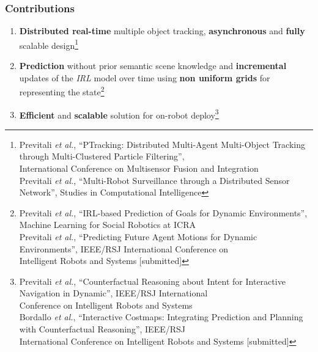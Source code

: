 \begin{frame}
	\frametitle{Contributions}
	
	\Large
	
	\begin{enumerate}
		\item \textbf{Distributed real-time} multiple object tracking, \textbf{asynchronous} and
			  \textbf{fully} scalable design\footnote{\tiny Previtali \emph{et
			  al.}, ``PTracking: Distributed Multi-Agent Multi-Object Tracking through Multi-Clustered
			  Particle Filtering'',\\ \hspace{2.02cm} International Conference on Multisensor Fusion and
			  Integration \\ \hspace{0.5cm} Previtali \emph{et al.}, ``Multi-Robot Surveillance through
			  a Distributed Sensor Network'', Studies in Computational Intelligence}
		\item \textbf{Prediction} without prior semantic scene knowledge and \textbf{incremental}
			  updates of the \emph{IRL} model over time using \textbf{non uniform grids} for
			  representing the state\footnote{\tiny Previtali \emph{et al.}, ``IRL-based Prediction of
			  Goals for Dynamic Environments'', Machine Learning for Social Robotics at ICRA\\
			  \hspace{0.5cm} Previtali \emph{et al.}, ``Predicting Future Agent Motions for Dynamic
			  Environments'', IEEE/RSJ International Conference on\\ \hspace{2.02cm} Intelligent Robots
			  and Systems [submitted]}
		\item \textbf{Efficient} and \textbf{scalable} solution for on-robot deploy\footnote{\tiny
			  Previtali \emph{et al.}, ``Counterfactual Reasoning about Intent for Interactive
			  Navigation in Dynamic'', IEEE/RSJ International\\ \hspace{2.02cm} Conference on
			  Intelligent Robots and Systems\\ \hspace{0.5cm} Bordallo \emph{et al.},
			  ``Interactive Costmaps: Integrating Prediction and Planning with Counterfactual
			  Reasoning'', IEEE/RSJ\\ \hspace{2.02cm} International Conference on Intelligent Robots and
			  Systems [submitted]}
	\end{enumerate}
\end{frame}

